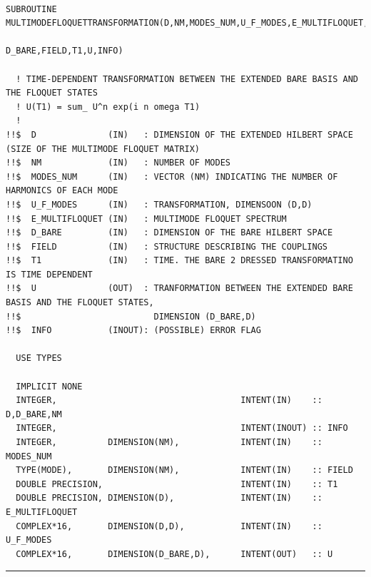 \documentclass[10pt,a4paper]{article}
\begin{document}
\begin{verbatim}

SUBROUTINE MULTIMODEFLOQUETTRANSFORMATION(D,NM,MODES_NUM,U_F_MODES,E_MULTIFLOQUET,
                                                                D_BARE,FIELD,T1,U,INFO) 

  ! TIME-DEPENDENT TRANSFORMATION BETWEEN THE EXTENDED BARE BASIS AND THE FLOQUET STATES
  ! U(T1) = sum_ U^n exp(i n omega T1)
  ! 
!!$  D              (IN)   : DIMENSION OF THE EXTENDED HILBERT SPACE (SIZE OF THE MULTIMODE FLOQUET MATRIX)
!!$  NM             (IN)   : NUMBER OF MODES            
!!$  MODES_NUM      (IN)   : VECTOR (NM) INDICATING THE NUMBER OF HARMONICS OF EACH MODE
!!$  U_F_MODES      (IN)   : TRANSFORMATION, DIMENSOON (D,D) 
!!$  E_MULTIFLOQUET (IN)   : MULTIMODE FLOQUET SPECTRUM
!!$  D_BARE         (IN)   : DIMENSION OF THE BARE HILBERT SPACE
!!$  FIELD          (IN)   : STRUCTURE DESCRIBING THE COUPLINGS
!!$  T1             (IN)   : TIME. THE BARE 2 DRESSED TRANSFORMATINO IS TIME DEPENDENT
!!$  U              (OUT)  : TRANFORMATION BETWEEN THE EXTENDED BARE BASIS AND THE FLOQUET STATES, 
!!$                          DIMENSION (D_BARE,D)
!!$  INFO           (INOUT): (POSSIBLE) ERROR FLAG
 
  USE TYPES

  IMPLICIT NONE
  INTEGER,                                    INTENT(IN)    :: D,D_BARE,NM 
  INTEGER,                                    INTENT(INOUT) :: INFO
  INTEGER,          DIMENSION(NM),            INTENT(IN)    :: MODES_NUM
  TYPE(MODE),       DIMENSION(NM),            INTENT(IN)    :: FIELD  
  DOUBLE PRECISION,                           INTENT(IN)    :: T1 
  DOUBLE PRECISION, DIMENSION(D),             INTENT(IN)    :: E_MULTIFLOQUET 
  COMPLEX*16,       DIMENSION(D,D),           INTENT(IN)    :: U_F_MODES 
  COMPLEX*16,       DIMENSION(D_BARE,D),      INTENT(OUT)   :: U 

\end{verbatim}
\begin{center}
\rule{12cm}{1pt}
\end{center}
\end{document}
